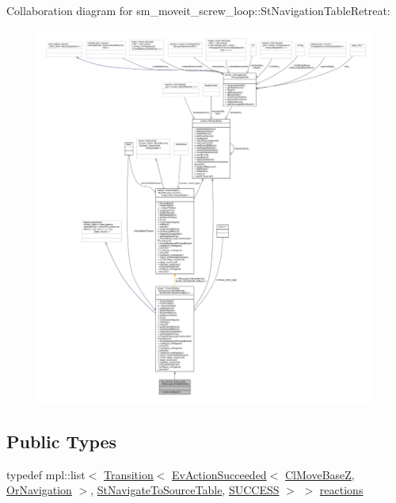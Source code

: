 Collaboration diagram for sm\+\_\+moveit\+\_\+screw\+\_\+loop\+:\+:St\+Navigation\+Table\+Retreat\+:
\nopagebreak
\begin{figure}[H]
\begin{center}
\leavevmode
\includegraphics[width=350pt]{structsm__moveit__screw__loop_1_1StNavigationTableRetreat__coll__graph}
\end{center}
\end{figure}
\subsection*{Public Types}
\begin{DoxyCompactItemize}
\item 
typedef mpl\+::list$<$ \hyperlink{classsmacc_1_1Transition}{Transition}$<$ \hyperlink{structsmacc_1_1default__events_1_1EvActionSucceeded}{Ev\+Action\+Succeeded}$<$ \hyperlink{classcl__move__base__z_1_1ClMoveBaseZ}{Cl\+Move\+BaseZ}, \hyperlink{classsm__moveit__screw__loop_1_1OrNavigation}{Or\+Navigation} $>$, \hyperlink{structsm__moveit__screw__loop_1_1StNavigateToSourceTable}{St\+Navigate\+To\+Source\+Table}, \hyperlink{structsmacc_1_1default__transition__tags_1_1SUCCESS}{S\+U\+C\+C\+E\+SS} $>$ $>$ \hyperlink{structsm__moveit__screw__loop_1_1StNavigationTableRetreat_a1d3451203ca891f3b92af69a1222d278}{reactions}
\end{DoxyCompactItemize}
